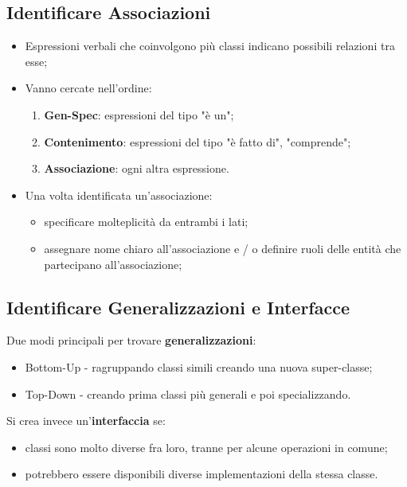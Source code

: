 \documentclass{article}
\begin{document}
    \subsection{Identificare Associazioni}
      \begin{itemize}
        \item Espressioni verbali che coinvolgono più classi indicano possibili relazioni tra esse;
        \item Vanno cercate nell'ordine:
          \begin{enumerate}
            \item \textbf{Gen-Spec}: espressioni del tipo "è un";
            \item \textbf{Contenimento}: espressioni del tipo "è fatto di", "comprende";
            \item \textbf{Associazione}: ogni altra espressione.
          \end{enumerate} 
        \item Una volta identificata un'associazione:
          \begin{itemize}
            \item specificare molteplicità da entrambi i lati; 
            \item assegnare nome chiaro all'associazione e / o definire ruoli delle entità che partecipano all'associazione;
          \end{itemize}
      \end{itemize}
    \subsection{Identificare Generalizzazioni e Interfacce}
      Due modi principali per trovare \textbf{generalizzazioni}:
      \begin{itemize}
        \item Bottom-Up - ragruppando classi simili creando una nuova super-classe;
        \item Top-Down - creando prima classi più generali e poi specializzando.
      \end{itemize}
      Si crea invece un'\textbf{interfaccia} se: 
      \begin{itemize}
        \item classi sono molto diverse fra loro, tranne per alcune operazioni in comune; 
        \item potrebbero essere disponibili diverse implementazioni della stessa classe.
      \end{itemize}
\end{document}
